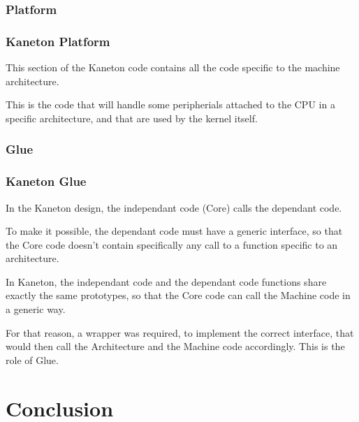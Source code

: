\subsubsection{Platform}

\begin{frame}
  \frametitle{Kaneton Platform}
  
  This section of the Kaneton code contains all the code specific to the machine architecture.

  \-

  This is the code that will handle some peripherials attached to the CPU in a specific architecture, and that are used by the kernel itself.

\end{frame}

\subsubsection{Glue}

\begin{frame}
  \frametitle{Kaneton Glue}

  In the Kaneton design, the independant code (Core) calls the dependant code.

  \-

  To make it possible, the dependant code must have a generic interface, so that the Core code doesn't contain specifically any call to a function specific to an architecture.

  \-

  In Kaneton, the independant code and the dependant code functions share exactly the same prototypes, so that the Core code can call the Machine code in a generic way.

  \-

  For that reason, a wrapper was required, to implement the correct interface, that would then call the Architecture and the Machine code accordingly. This is the role of Glue.

\end{frame}

\section{Conclusion}

